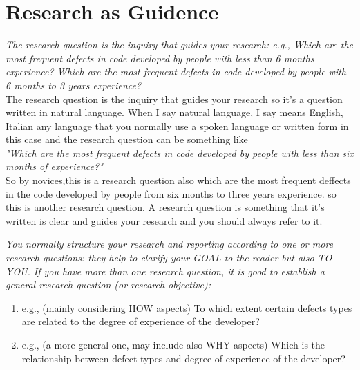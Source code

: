 \documentclass[conference, compsoc, twoside]{IEEEtran}
\begin{document}
\section{Research as Guidence} %
\label{sec:research_as_guidence}
\textit{The research question is the inquiry that guides your research: e.g., Which are the most frequent defects in code developed by people with less than 6 months experience? Which are the most frequent defects in code developed by people with 6 months to 3 years experience? }\\
The research question is the inquiry that guides your research so it's a question written in natural language. When I say natural language, I say means English, Italian any language that you normally use a spoken language or written form in this case and the research question can be something like \\
\textit{"Which are the most frequent defects in code developed by people with less than six months of experience?"}\\
So by novices,this is a research question also which are the most frequent deffects in the code developed by people from six months to three years experience. 
so this is another research question.
A research question is something that it's written is clear and guides your research and you should always refer to it. 

\textit{You normally structure your research and reporting according to one or more research questions: they help to clarify your GOAL to the reader but also TO YOU.
If you have more than one research question, it is good to establish a general research question (or research objective):}
\begin{enumerate}
	\item e.g., (mainly considering HOW aspects) To which extent certain defects types are related to the degree of experience of the developer?
	\item e.g., (a more general one, may include also WHY aspects) Which is the relationship between defect types and degree of experience of the developer?
\end{enumerate}
\end{document}
